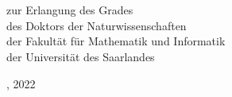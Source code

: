 \begin{titlepage}
    \begin{addmargin}[-1cm]{-3cm}
    \begin{center}
        \large

        \hfill

        \vfill

        \begingroup
            \color{CTtitle}\spacedallcaps{\myTitle} \\ \bigskip
        \endgroup

        \spacedlowsmallcaps{\myName}

        \vfill

	    \\
	    \bigskip
	    zur  Erlangung  des  Grades\\
	    des  Doktors  der Naturwissenschaften\\
	    der Fakultät für Mathematik und Informatik\\
	    der Universität des Saarlandes
        \bigskip

        \myLocation, 2022

        \vfill

    \end{center}
  \end{addmargin}
\end{titlepage}
